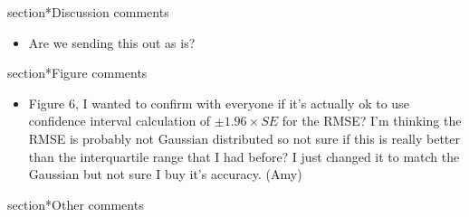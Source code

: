 section*{Discussion comments}
\begin{itemize}
    \item Are we sending this out as is? 
\end{itemize}

section*{Figure comments}
\begin{itemize}
    \item Figure 6, I wanted to confirm with everyone if it's actually ok to use confidence interval calculation of $\pm 1.96\times SE$ for the RMSE? I'm thinking the RMSE is probably not Gaussian distributed so not sure if this is really better than the interquartile range that I had before? I just changed it to match the Gaussian but not sure I buy it's accuracy. (Amy)
\end{itemize}

section*{Other comments}


